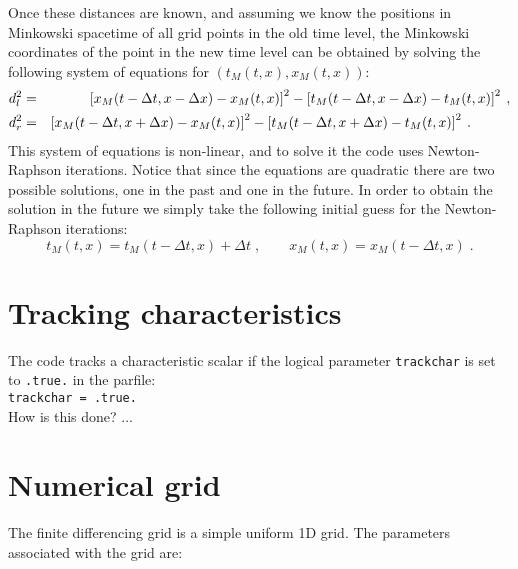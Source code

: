 \documentclass[12pt]{article}
\begin{document}
Once these distances are known, and assuming we know the positions in
Minkowski spacetime of all grid points in the old time level, the
Minkowski coordinates of the point in the new time level can be
obtained by solving the following system of equations for $(t_M(t,x),
x_M(t,x))$:
\begin{eqnarray}
d_l^2 &=&  \left[ x_M(t-\Delta t,x-\Delta x) - x_M(t,x) \right]^2 
- \left[ t_M(t-\Delta t,x-\Delta x) - t_M(t,x) \right]^2 \: , \\
d_r^2 &=&  \left[ x_M(t-\Delta t,x+\Delta x) - x_M(t,x) \right]^2 
- \left[ t_M(t-\Delta t,x+\Delta x) - t_M(t,x) \right]^2 \: . \hspace{10mm} 
\end{eqnarray}
This system of equations is non-linear, and to solve it the code uses
Newton-Raphson iterations.  Notice that since the equations are
quadratic there are two possible solutions, one in the past and one
in the future.  In order to obtain the solution in the future we
simply take the following initial guess for the Newton-Raphson
iterations:
\begin{equation}
t_M(t,x) = t_M(t-\Delta t,x) + \Delta t \; , \qquad
x_M(t,x) = x_M(t-\Delta t,x) \; .
\end{equation}



\setcounter{equation}{0}
\section{Tracking characteristics}
\label{sec:characteristics}

The code tracks a characteristic scalar if the logical parameter
\texttt{trackchar} is set to \texttt{.true.} in the parfile: \\

\texttt{trackchar = .true.} \\

How is this done? ...



\setcounter{equation}{0}
\section{Numerical grid}
\label{sec:grid}

The finite differencing grid is a simple uniform 1D grid.  The
parameters associated with the grid are:
\end{document}
